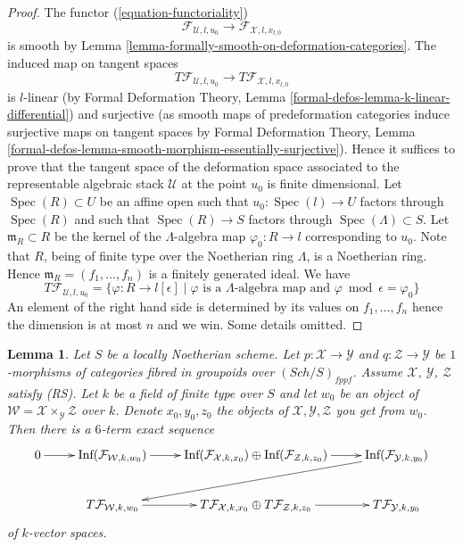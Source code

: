 \documentclass{stacks-project}
\theoremstyle{plain}
\newtheorem{lemma}[subsection]{Lemma}
\theoremstyle{definition}
\theoremstyle{remark}
\numberwithin{equation}{subsection}
\def\Spec{\mathop{\mathrm{Spec}}}
\def\Sch{\mathit{Sch}}
\begin{document}
\begin{proof}
\medskip\noindent
The functor (\ref{equation-functoriality})
$$
\mathcal{F}_{\mathcal{U}, l, u_0}
\longrightarrow
\mathcal{F}_{\mathcal{X}, l, x_{l, 0}}
$$
is smooth by Lemma \ref{lemma-formally-smooth-on-deformation-categories}.
The induced map on tangent spaces
$$
T\mathcal{F}_{\mathcal{U}, l, u_0}
\longrightarrow
T\mathcal{F}_{\mathcal{X}, l, x_{l, 0}}
$$
is $l$-linear (by
Formal Deformation Theory, Lemma
\ref{formal-defos-lemma-k-linear-differential})
and surjective (as smooth maps of predeformation categories induce
surjective maps on tangent spaces by
Formal Deformation Theory, Lemma
\ref{formal-defos-lemma-smooth-morphism-essentially-surjective}).
Hence it suffices to prove that the tangent space of the deformation
space associated to the representable algebraic stack $\mathcal{U}$
at the point $u_0$ is finite dimensional. Let $\Spec(R) \subset U$ be
an affine open such that $u_0 : \Spec(l) \to U$ factors through $\Spec(R)$
and such that $\Spec(R) \to S$ factors through $\Spec(\Lambda) \subset S$.
Let $\mathfrak m_R \subset R$ be the kernel of the $\Lambda$-algebra map
$\varphi_0 : R \to l$ corresponding to $u_0$. Note that $R$, being of finite
type over the Noetherian ring $\Lambda$, is a Noetherian ring. Hence
$\mathfrak m_R = (f_1, \ldots, f_n)$ is a finitely generated ideal.
We have
$$
T\mathcal{F}_{\mathcal{U}, l, u_0}
=
\{\varphi : R \to l[\epsilon] \mid
\varphi \text{ is a } \Lambda\text{-algebra map and }
\varphi \bmod \epsilon = \varphi_0\}
$$
An element of the right hand side is determined by its values on
$f_1, \ldots, f_n$ hence the dimension is at most $n$ and we win.
Some details omitted.
\end{proof}

\begin{lemma}
\label{lemma-fibre-product-tangent-spaces}
Let $S$ be a locally Noetherian scheme. Let $p : \mathcal{X} \to \mathcal{Y}$
and $q : \mathcal{Z} \to \mathcal{Y}$ be $1$-morphisms of categories
fibred in groupoids over $(\Sch/S)_{fppf}$. Assume $\mathcal{X}$,
$\mathcal{Y}$, $\mathcal{Z}$ satisfy (RS).
Let $k$ be a field of finite type over $S$ and let $w_0$ be an object of
$\mathcal{W} = \mathcal{X} \times_\mathcal{Y} \mathcal{Z}$ over $k$.
Denote $x_0, y_0, z_0$ the objects of $\mathcal{X}, \mathcal{Y}, \mathcal{Z}$
you get from $w_0$. Then there is a $6$-term exact sequence
$$
\xymatrix{
0 \ar[r] &
\text{Inf}(\mathcal{F}_{\mathcal{W}, k, w_0}) \ar[r] &
\text{Inf}(\mathcal{F}_{\mathcal{X}, k, x_0}) \oplus
\text{Inf}(\mathcal{F}_{\mathcal{Z}, k, z_0}) \ar[r] &
\text{Inf}(\mathcal{F}_{\mathcal{Y}, k, y_0}) \ar[lld] \\
 &
T\mathcal{F}_{\mathcal{W}, k, w_0} \ar[r] &
T\mathcal{F}_{\mathcal{X}, k, x_0} \oplus
T\mathcal{F}_{\mathcal{Z}, k, z_0} \ar[r] &
T\mathcal{F}_{\mathcal{Y}, k, y_0}
}
$$
of $k$-vector spaces.
\end{lemma}
\end{document}
